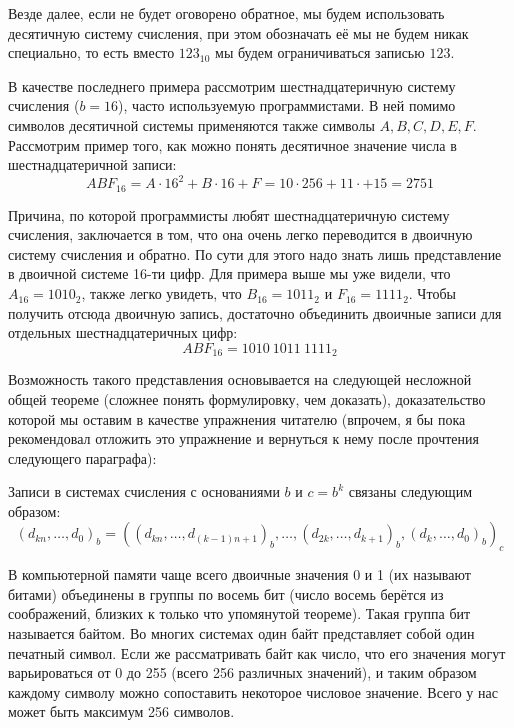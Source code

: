 Везде далее, если не будет оговорено обратное, мы будем использовать десятичную систему счисления, при этом обозначать её мы не будем никак специально, то есть вместо $123_{10}$ мы будем ограничиваться записью $123$.

В качестве последнего примера рассмотрим шестнадцатеричную систему счисления ($b=16$), часто используемую программистами. В ней помимо символов десятичной системы применяются также символы $A, B, C, D, E, F$. Рассмотрим пример того, как можно понять десятичное значение числа в шестнадцатеричной записи:
$$ABF_{16} = A\cdot 16^2 + B\cdot 16 + F = 10\cdot 256 + 11 \cdot + 15 = 2751$$

Причина, по которой программисты любят шестнадцатеричную систему счисления, заключается в том, что она очень легко переводится в двоичную систему счисления и обратно. По сути для этого надо знать лишь представление в двоичной системе 16-ти цифр. Для примера выше мы уже видели, что $A_{16} = 1010_2$, также легко увидеть, что $B_{16} = 1011_2$ и $F_{16} = 1111_2$. Чтобы получить отсюда двоичную запись, достаточно объединить двоичные записи для отдельных шестнадцатеричных цифр: $$ABF_{16} = 1010\:1011\:1111_2$$

Возможность такого представления основывается на следующей несложной общей теореме (сложнее понять формулировку, чем доказать), доказательство которой мы оставим в качестве упражнения читателю (впрочем, я бы пока рекомендовал отложить это упражнение и вернуться к нему после прочтения следующего параграфа):
\begin{thm}
Записи в системах счисления с основаниями $b$ и $c = b^k$ связаны следующим образом: $$(d_{kn},\dots, d_0)_b = ((d_{kn}, \ldots, d_{(k-1)n + 1})_b, \dots, (d_{2k}, \dots, d_{k+1})_b , (d_k, \dots, d_0)_b)_c$$
\end{thm}

В компьютерной памяти чаще всего двоичные значения 0 и 1 (их называют битами) объединены в группы по восемь бит (число восемь берётся из соображений, близких к только что упомянутой теореме). Такая группа бит называется байтом. Во многих системах один байт представляет собой один печатный символ. Если же рассматривать байт как число, что его значения могут варьироваться от 0 до 255 (всего 256 различных значений), и таким образом каждому символу можно сопоставить некоторое числовое значение. Всего у нас может быть максимум 256 символов.


